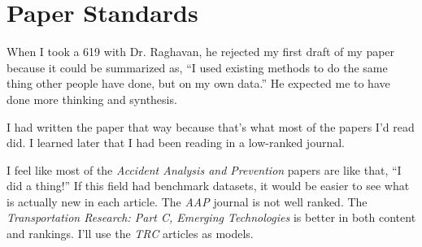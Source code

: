 \section{Paper Standards}

When I took a 619 with Dr. Raghavan, he rejected my first draft of my paper because it could be summarized as, ``I used existing methods to do the same thing other people have done, but on my own data.''  He expected me to have done more thinking and synthesis.  

I had written the paper that way because that's what most of the papers I'd read did.  I learned later that I had been reading in a low-ranked journal.  

I feel like most of the {\it Accident Analysis and Prevention} papers are like that, ``I did a thing!''  If this field had benchmark datasets, it would be easier to see what is actually new in each article.  The {\it AAP} journal is not well ranked.  The {\it Transportation Research: Part C, Emerging Technologies} is better in both content and rankings.  I'll use the {\it TRC} articles as models.
